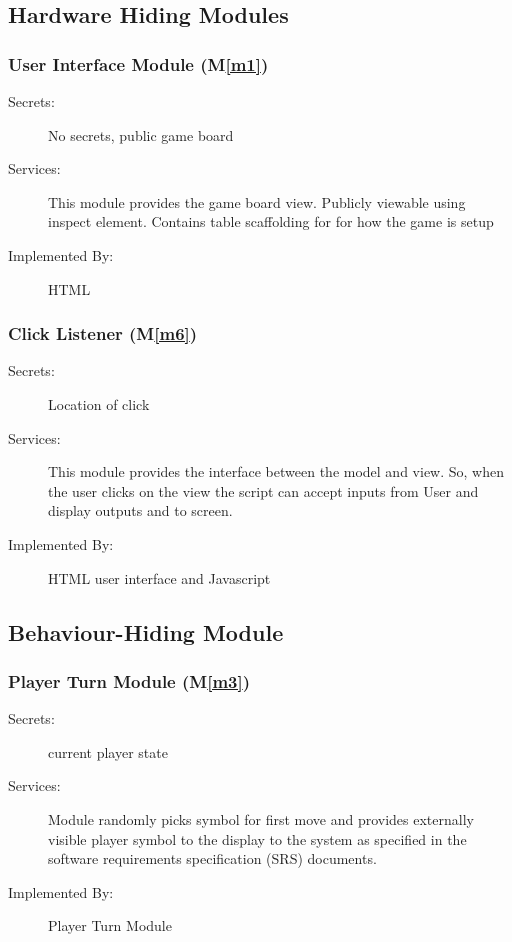 \documentclass[12pt, titlepage]{article}
\newcommand{\mref}[1]{M\ref{#1}}
\begin{document}
\subsection{Hardware Hiding Modules}
\subsubsection{User Interface Module (\mref{m1})}
\begin{description}
\item[Secrets:] No secrets, public game board
\item[Services:]This module provides the game board view. Publicly viewable using inspect element. Contains table scaffolding for for how the game is setup 
\item[Implemented By:] HTML
\end{description}

\subsubsection{Click Listener (\mref{m6})}
\begin{description}
\item[Secrets:] Location of click
\item[Services:]This module provides the interface between the model and view. So, when the user clicks on the view the script can accept inputs from User and display outputs and to screen.
\item[Implemented By:] HTML user interface and Javascript 
\end{description}
\subsection{Behaviour-Hiding Module}

\subsubsection{Player Turn Module (\mref{m3})}
\begin{description}
\item[Secrets:] current player state
\item[Services:] Module randomly picks symbol for first move and provides externally visible player symbol to the display to
the system as specified in the software requirements specification (SRS) documents.
\item[Implemented By:] Player Turn Module
\end{description}
\end{document}
